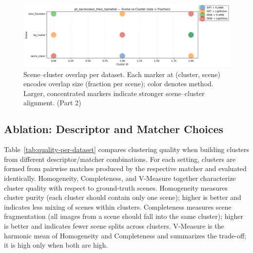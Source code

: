 \documentclass[report.tex]{subfiles}
\begin{document}
\begin{figure}[!htbp]\ContinuedFloat
\centering
\includegraphics[width=\linewidth]{images/scene_cluster_by_dataset/pt_sacrecoeur_trevi_tajmahal.png}

\caption{Scene–cluster overlap per dataset. Each marker at (cluster, scene) encodes overlap size (fraction per scene); color denotes method. Larger, concentrated markers indicate stronger scene–cluster alignment. (Part 2)}
\label{fig:scene-cluster-D}
\end{figure}


\subsection{Ablation: Descriptor and Matcher Choices}
Table~\ref{tab:quality-per-dataset} compares clustering quality when building clusters from different descriptor/matcher combinations. For each setting, clusters are formed from pairwise matches produced by the respective matcher and evaluated identically.
Homogeneity, Completeness, and V-Measure together characterize cluster quality with respect to ground-truth scenes. 
Homogeneity measures cluster purity (each cluster should contain only one scene); higher is better and indicates less mixing of scenes within clusters. 
Completeness measures scene fragmentation (all images from a scene should fall into the same cluster); higher is better and indicates fewer scene splits across clusters. 
V-Measure is the harmonic mean of Homogeneity and Completeness and summarizes the trade-off; it is high only when both are high.
\end{document}
